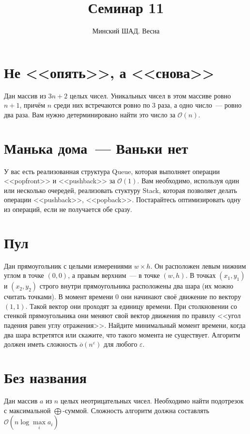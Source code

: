 \documentclass[addpoints]{exam}
\title{Семинар 11}
\author{Минский ШАД. Весна}
\begin{document}
\maketitle

\section{Не <<опять>>, а <<снова>>}

Дан массив из $3n + 2$ целых чисел. Уникальных чисел в этом массиве ровно $n+1$, причём $n$ среди них встречаются ровно по $3$ раза, а одно число~--- ровно два раза. Вам нужно детерминировано найти это число за $\mathcal{O}(n)$.

\section{Манька дома~--- Ваньки нет}

У вас есть реализованная структура Queue, которая выполняет операции <<popfront>> и <<pushback>> за $\mathcal{O}(1)$. Вам необходимо, используя один или несколько очередей, реализовать стуктуру Stack, которая позволяет делать операции <<pushback>>, <<popback>>. Постарайтесь оптимизировать одну из операций, если не получается обе сразу. 

\section{Пул}

Дан прямоугольник с целыми измерениями $w \times h$. Он расположен левым нижним углом в точке $(0,0)$, а правым верхним~--- в точке $(w,h)$. В точках $(x_1,y_1)$ и $(x_2,y_2)$ строго внутри прямоугольника расположены два шара (их можно считать точками). В момент времени $0$ они начинают своё движение по вектору $(1,1)$. Такой вектор они проходят за единицу времени. При столкновении со стенкой прямоугольника они меняют свой вектор движения по правилу <<угол падения равен углу отражения>>. Найдите минимальный момент времени, когда два шара встретятся или скажите, что такого момента не существует. Алгоритм должен иметь сложность $\overline{o}(n^{\varepsilon})$ для любого $\varepsilon$.

\section{Без названия}

Дан массив $a$ из $n$ целых неотрицательных чисел. Необходимо найти подотрезок с максимальной $\bigoplus$-суммой. Сложность алгоритм должна составлять $\mathcal{O}(n \log{\max\limits_i{a_i}})$
\end{document}
